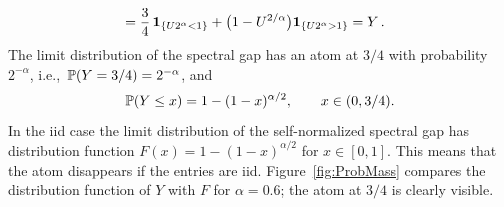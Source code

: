 \begin{example}
\begin{equation*}
\begin{split}
& =\dfrac{3}{4}\,  \I_{\{U 2^{\alpha }<1\}}+
\big(1-U^{2/\alpha}\big)\I_{\{U2^{\alpha
  }> 1\}}=Y\,.
\end{split}
\end{equation*}
The limit  distribution of the spectral gap
has an atom at $3/4$ with probability $2^{-\alpha}$, i.e.,~$\P(Y=3/4)=2^{-\alpha}$, and
\begin{equation*}
\P(Y\le x)= 1- (1-x)^{\alpha/2},\qquad x\in (0,3/4).
\end{equation*}
In the iid case the limit distribution of the self-normalized spectral gap has distribution function $F(x) = 1- (1-x)^{\alpha/2}$ for $x\in [0,1]$. This means that the atom disappears if the entries are iid. Figure~\ref{fig:ProbMass} compares the distribution function of $Y$
with $F$ for $\alpha=0.6$; the atom at $3/4$ is clearly visible.


\end{example}
